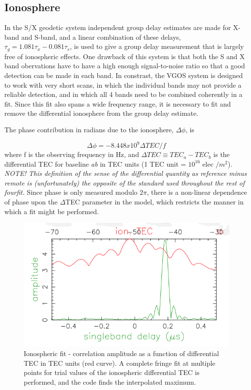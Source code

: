 \subsection {Ionosphere}

In the S/X geodetic system independent group delay estimates
are made for X-band and S-band, and a linear combination of these
delays,
$\tau_g=1.081 \tau_x - 0.081 \tau_s$,
is used to give a group delay measurement that is largely
free of ionospheric effects. One drawback of this system is that
both the S and X band obervations have to have a high enough 
signal-to-noise ratio so that a good detection can be made in each band.
In constrast,
the VGOS system is designed to work with very short scans, in which
the individual bands may not provide a reliable detection, and
in which all 4 bands need to be combined coherently in a fit. Since
this fit also spans a wide frequency range, it is necessary to
fit and remove the differential ionosphere from the group delay
estimate.

The phase contribution in radians due to the ionosphere, 
$\Delta \phi$, is 

\begin{equation}
        \Delta \phi = -8.448 x 10^9 \Delta TEC / f
\end{equation}
%
where f is the observing frequency in Hz, and 
$\Delta TEC \equiv TEC_a - TEC_b$ is the differential TEC
for baseline \textit{ab} in TEC units 
(1 TEC unit = $10^{16}$ elec $/ m^2$). 
\textit{NOTE! This definition of the sense of the differential
quantity as reference minus remote is (unfortunately) the opposite
of the standard used throughout the rest of fourfit.}
Since phase is only measured modulo $2\pi$, there is a non-linear
dependence of phase upon the $\Delta$TEC parameter in the
model, which restricts the manner in which a fit might
be performed.

\begin{figure}[tb]
  \centering
  \includegraphics[width=.5\linewidth]{./ionosphere2.png}
  \caption{Ionospheric fit - correlation amplitude as a function of differential TEC
in TEC units (red curve). A complete fringe
fit at multiple points for trial values of the ionospheric
differential TEC is performed, and the code finds
the interpolated maximum.}
  \label{fig:ionosphere}
\end{figure}


